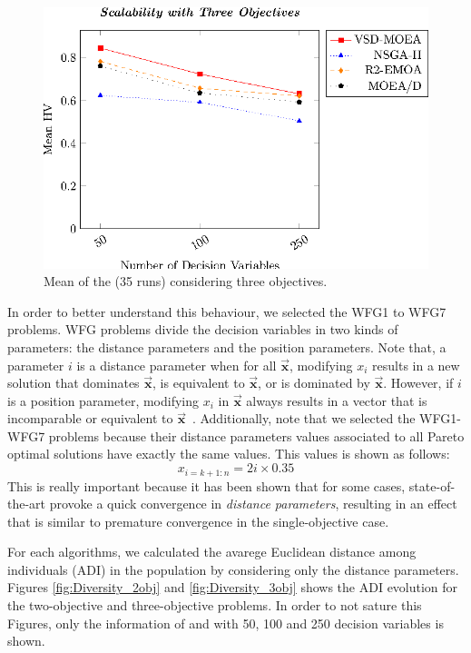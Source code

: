 \begin{figure}[t]
\centering
\includegraphics[]{Images/Graphic-Scalability-3obj_tikz-figure0.eps}
%
\caption{Mean of the \HV{} (35 runs) considering three objectives.} \label{fig:variable-decision-scalability-3obj}
\end{figure}

In order to better understand this behaviour, we selected the WFG1 to WFG7 problems.
%
WFG problems divide the decision variables in two kinds of parameters: the distance parameters and the position parameters.
%
Note that, a parameter $i$ is a distance parameter when for all $\vec{\mathbf{x}}$, modifying $x_i$ results in a new solution 
that dominates $\vec{\mathbf{x}}$, is equivalent to $\vec{\mathbf{x}}$, or is dominated by $\vec{\mathbf{x}}$.
%
However, if $i$ is a position parameter, modifying $x_i$ in $\vec{\mathbf{x}}$ always results in a vector that is incomparable or 
equivalent to $\vec{\mathbf{x}}$~\cite{huband2005scalable}.
%
Additionally, note that we selected the WFG1-WFG7 problems because their distance parameters values associated to all Pareto optimal solutions 
have exactly the same values.
%
This values is shown as follows:
\begin{equation}
   x_{i=k+1:n} = 2i \times 0.35
\end{equation}
%
This is really important because it has been shown that for some cases, state-of-the-art
\MOEAS{} provoke a quick convergence in \textit{distance parameters}, resulting in an effect that is similar to premature convergence
in the single-objective case.

For each algorithms, we calculated the avarege Euclidean distance among individuals (ADI) in the population by considering only 
the distance parameters.
%
Figures \ref{fig:Diversity_2obj} and \ref{fig:Diversity_3obj} shows the ADI evolution for the two-objective and three-objective problems.
%
In order to not sature this Figures, only the information of \VSDMOEA{} and \RMOEA{} with 50, 100 and 250 decision variables is shown.


